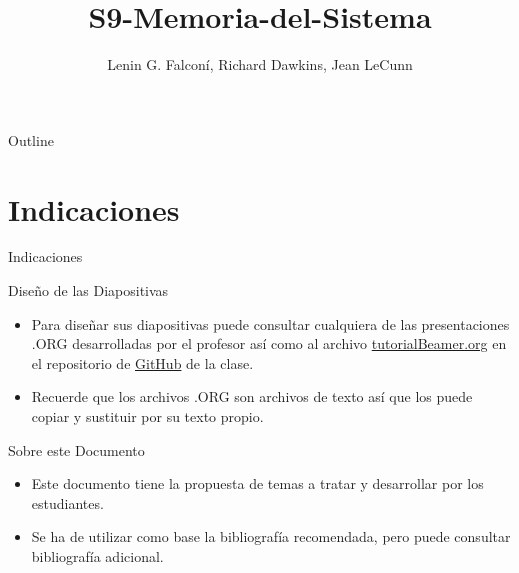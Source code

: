 \documentclass[presentation]{beamer}
\author{Lenin G. Falconí, Richard Dawkins, Jean LeCunn}
\date{}
\title{S9-Memoria-del-Sistema}
\begin{document}
\maketitle
\begin{frame}{Outline}
\tableofcontents
\end{frame}



\section{Indicaciones}
\label{sec:orga4b06de}
\begin{frame}[allowframebreaks]{Indicaciones}
\end{frame}
\begin{frame}[label={sec:orgbe6d252}]{Diseño de las Diapositivas}
\begin{itemize}
\item Para diseñar sus diapositivas puede consultar cualquiera de las
presentaciones .ORG desarrolladas por el profesor así como al
archivo \href{https://github.com/LeninGF/EPN-Lectures/blob/main/iccd332ArqComp-2024-B/Tutoriales/Beamer-Emacs/tutorialBeamer.org}{tutorialBeamer.org} en el repositorio de \href{https://github.com/LeninGF/EPN-Lectures/blob/main/iccd332ArqComp-2024-B/Tutoriales/Beamer-Emacs/tutorialBeamer.org}{GitHub} de la clase.
\item Recuerde que los archivos .ORG son archivos de texto así que los
puede copiar y sustituir por su texto propio.
\end{itemize}
\end{frame}
\begin{frame}[label={sec:orga653d3f}]{Sobre este Documento}
\begin{itemize}
\item Este documento tiene la propuesta de temas a tratar y desarrollar
por los estudiantes.
\item Se ha de utilizar como base la bibliografía recomendada, pero puede
consultar bibliografía adicional.
\end{itemize}
\end{frame}
\end{document}
